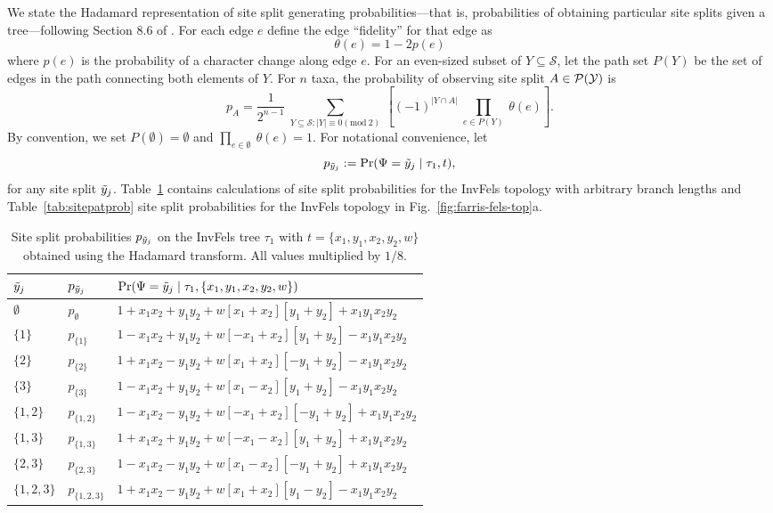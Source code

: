 We state the Hadamard representation of site split generating probabilities---that is, probabilities of obtaining particular site splits given a tree---following Section 8.6 of \citet{Semple2003-em}.
For each edge $e$ define the edge ``fidelity'' for that edge as
\[
\theta(e) = 1-2p(e)
\]
where $p(e)$ is the probability of a character change along edge $e$.
For an even-sized subset of $Y\subseteq\mathcal{S}$, let the path set $P(Y)$ be the set of edges in the path connecting both elements of $Y$.
For $n$ taxa, the probability of observing site split $A\in\mathcal{P}(\mathcal{Y})$ is
\begin{equation}
\label{eq:hadamard_probability}
p_A = \frac{1}{2^{n-1}} \ \sum_{Y \subseteq \mathcal{S} : |Y| \equiv 0 (\mathrm{mod} \ 2)} \ \left[(-1)^{|Y \cap A|} \ \prod_{e\in P(Y)} \ \theta(e) \right].
\end{equation}
By convention, we set $P(\emptyset)=\emptyset$ and $\prod_{e\in\emptyset} \ \theta(e) = 1$.
For notational convenience, let
\[
p_{\tilde{y}_j} := \Pr(\Psi=\tilde{y}_j \mid \tau_1,t),
\]
for any site split $\tilde{y}_j$.
Table~\ref{tab:gen-sitepatprob} contains calculations of site split probabilities for the InvFels topology with arbitrary branch lengths and Table~\ref{tab:sitepatprob} site split probabilities for the InvFels topology in Fig.~\ref{fig:farris-fels-top}a.

\begin{table}[ht]
\centering
\begin{tabular}{|l|l|l|}
    \hline
$\tilde{y}_j$  & $p_{\tilde{y}_j}$ &$\Pr(\Psi=\tilde{y}_j \mid \tau_1,\{x_1,y_1,x_2,y_2,w\})$\\
    \hline
    $\emptyset$ & $p_{\emptyset}$   &$1 + x_1x_2 +  y_1y_2 +  w[  x_1 + x_2][  y_1 + y_2] + x_1y_1x_2y_2$\\
    $\{1\}$     & $p_{\{1\}}$       &$1 - x_1x_2 +  y_1y_2 +  w[- x_1 + x_2][  y_1 + y_2] - x_1y_1x_2y_2$\\
    $\{2\}$     & $p_{\{2\}}$       &$1 + x_1x_2 -  y_1y_2 +  w[  x_1 + x_2][- y_1 + y_2] - x_1y_1x_2y_2$\\
    $\{3\}$     & $p_{\{3\}}$       &$1 - x_1x_2 +  y_1y_2 +  w[  x_1 - x_2][  y_1 + y_2] - x_1y_1x_2y_2$\\
    $\{1,2\}$   & $p_{\{1,2\}}$     &$1 - x_1x_2 -  y_1y_2 +  w[- x_1 + x_2][- y_1 + y_2] + x_1y_1x_2y_2$\\
    $\{1,3\}$   & $p_{\{1,3\}}$     &$1 + x_1x_2 +  y_1y_2 +  w[- x_1 - x_2][  y_1 + y_2] + x_1y_1x_2y_2$\\
    $\{2,3\}$   & $p_{\{2,3\}}$     &$1 - x_1x_2 -  y_1y_2 +  w[  x_1 - x_2][- y_1 + y_2] + x_1y_1x_2y_2$\\
    $\{1,2,3\}$ & $p_{\{1,2,3\}}$   &$1 + x_1x_2 -  y_1y_2 +  w[  x_1 + x_2][  y_1 - y_2] - x_1y_1x_2y_2$\\
    \hline
\end{tabular}
\caption{Site split probabilities $p_{\tilde{y}_j}$ on the InvFels tree $\tau_1$ with $t=\{x_1,y_1,x_2,y_2,w\}$ obtained using the Hadamard transform.
All values multiplied by $1/8$.}
\label{tab:gen-sitepatprob}
\end{table}

